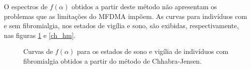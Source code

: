 \documentclass{ufscThesis}
\begin{document}
O espectros de $f(\alpha)$ obtidos a partir deste método não apresentam os problemas que as limitações do MFDMA impõem. As curvas para indivíduos com e sem fibromialgia, nos estados de vigília e sono, são exibidas, respectivamente, nas figuras \ref{ch_fm} e \ref{ch_hm}. \par

\begin{figure}[!h]
\center
{}
\quad
{}
\caption{Curvas de $f(\alpha)$ para os estados de sono e vigília de indivíduos com fibromialgia obtidos a partir do método de Chhabra-Jensen.}
\label{ch_fm}
\end{figure}
\end{document}
